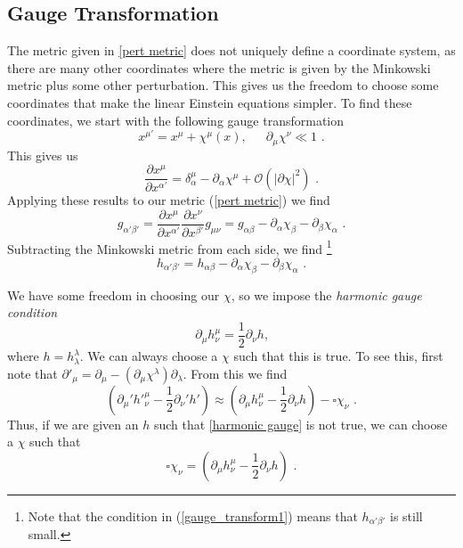 \documentclass[11pt]{cuthesis}
\newcommand{\mn}{_{\mu\nu}}
\newcommand{\fs}{\text{ .}}
\newcommand{\pd}{\partial}
\begin{document}
\subsection{Gauge Transformation}
The metric given in \ref{pert metric} does not uniquely define a coordinate system, as there are many other coordinates where the metric is given by the Minkowski metric plus some other perturbation. This gives us the freedom to choose some coordinates that make the linear Einstein equations simpler. To find these coordinates, we start with the following gauge transformation
\begin{equation} \label{gauge_transform1}
x^{\mu'}=x^\mu +\chi ^\mu (x)\text{,} \hspace{20pt}\partial_\mu \chi^\nu \ll 1\fs
\end{equation} 
This gives us
\begin{equation}
\frac{\pd x^\mu}{\pd x^{\alpha'}}=\delta^\mu_\alpha-\pd_\alpha\chi^\mu +\mathcal{O}(|\pd \chi|^2) \fs
\end{equation}  
Applying these results to our metric (\ref{pert metric}) we find
\begin{equation} 
g_{\alpha' \beta'}=\frac{\pd x^\mu}{\pd x^{\alpha'}}\frac{\pd x^\nu}{\pd x^{\beta'}}g\mn=g_{\alpha \beta}-\pd_\alpha \chi_\beta -\pd_\beta \chi_\alpha \fs
\end{equation}
Subtracting the Minkowski metric from each side, we find \footnote{Note that the condition in (\ref{gauge_transform1}) means that $h_{\alpha'\beta'}$ is still small.}
\begin{equation} \label{pert transf}
h_{\alpha' \beta'}=h_{\alpha \beta}-\pd_\alpha\chi_\beta-\pd_\beta\chi_\alpha \fs
\end{equation}

We have some freedom in choosing our $\chi$, so we impose the \textit{harmonic gauge condition}
\begin{equation} \label{harmonic gauge}
\partial_\mu h^\mu_\nu = \frac{1}{2} \partial_\nu h \text{,}
\end{equation}
where $h=h^\lambda_\lambda$. We can always choose a $\chi$ such that this is true. To see this, first note that $\partial'_\mu = \partial_\mu - (\partial_\mu \chi^\lambda) \partial_\lambda$. From this we find
\begin{equation}
(\partial_\mu' {h'}_\nu^\mu - \frac{1}{2}\partial_\nu' h') \approx (\partial_\mu h^\mu_\nu - \frac{1}{2} \partial_\nu h ) -\square \chi_\nu \fs
\end{equation}
Thus, if we are given an $h$ such that \ref{harmonic gauge} is not true, we can choose a $\chi$ such that 
\begin{equation} \label{harmonic chi}
\square \chi_\nu = (\partial_\mu h^\mu_\nu - \frac{1}{2}\partial_\nu h) \fs
\end{equation}
\end{document}
